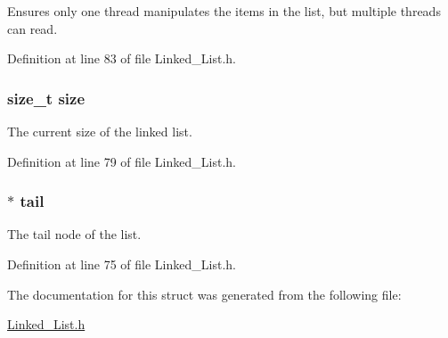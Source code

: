 Ensures only one thread manipulates the items in the list, but multiple threads can read. 



Definition at line 83 of file Linked\+\_\+\+List.\+h.

\hypertarget{struct_linked___list__t_a854352f53b148adc24983a58a1866d66}{}
\subsubsection[{size}]{\setlength{\rightskip}{0pt plus 5cm}size\+\_\+t size}\label{struct_linked___list__t_a854352f53b148adc24983a58a1866d66}


The current size of the linked list. 



Definition at line 79 of file Linked\+\_\+\+List.\+h.

\hypertarget{struct_linked___list__t_aca42aff10804c6229eae05f67c7cc6d7}{}
\subsubsection[{tail}]{$\ast$ tail}\label{struct_linked___list__t_aca42aff10804c6229eae05f67c7cc6d7}


The tail node of the list. 



Definition at line 75 of file Linked\+\_\+\+List.\+h.



The documentation for this struct was generated from the following file\+:\begin{DoxyCompactItemize}
\item 
\hyperlink{_linked___list_8h}{Linked\+\_\+\+List.\+h}\end{DoxyCompactItemize}

